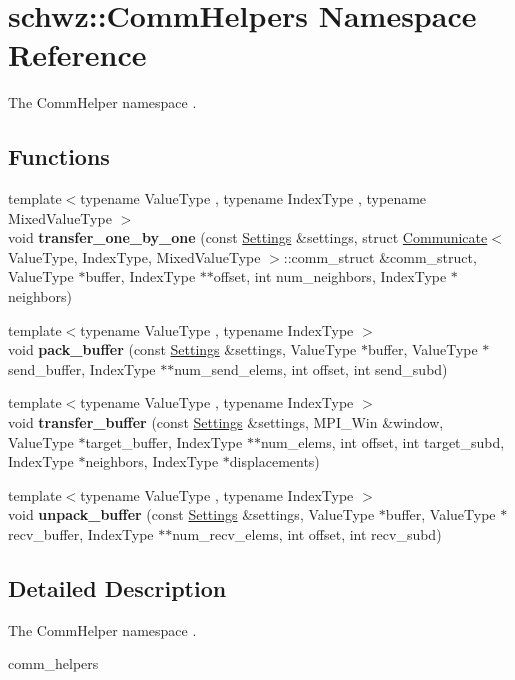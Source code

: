 \hypertarget{namespaceschwz_1_1CommHelpers}{}\section{schwz\+:\+:Comm\+Helpers Namespace Reference}
\label{namespaceschwz_1_1CommHelpers}


The Comm\+Helper namespace .  


\subsection*{Functions}
\begin{DoxyCompactItemize}
\item 
\mbox{\label{namespaceschwz_1_1CommHelpers_ad55122b484f131b8b63e7d82e8ff6e88}} 
{\footnotesize template$<$typename Value\+Type , typename Index\+Type , typename Mixed\+Value\+Type $>$ }\\void {\bfseries transfer\+\_\+one\+\_\+by\+\_\+one} (const \hyperlink{structschwz_1_1Settings}{Settings} \&settings, struct \hyperlink{classschwz_1_1Communicate}{Communicate}$<$ Value\+Type, Index\+Type, Mixed\+Value\+Type $>$\+::comm\+\_\+struct \&comm\+\_\+struct, Value\+Type $\ast$buffer, Index\+Type $\ast$$\ast$offset, int num\+\_\+neighbors, Index\+Type $\ast$neighbors)
\item 
\mbox{\label{namespaceschwz_1_1CommHelpers_af8b226ff485829069e8769eea1a9c1e7}} 
{\footnotesize template$<$typename Value\+Type , typename Index\+Type $>$ }\\void {\bfseries pack\+\_\+buffer} (const \hyperlink{structschwz_1_1Settings}{Settings} \&settings, Value\+Type $\ast$buffer, Value\+Type $\ast$send\+\_\+buffer, Index\+Type $\ast$$\ast$num\+\_\+send\+\_\+elems, int offset, int send\+\_\+subd)
\item 
\mbox{\label{namespaceschwz_1_1CommHelpers_a05d10520ce2980f012ca6e89916801b4}} 
{\footnotesize template$<$typename Value\+Type , typename Index\+Type $>$ }\\void {\bfseries transfer\+\_\+buffer} (const \hyperlink{structschwz_1_1Settings}{Settings} \&settings, M\+P\+I\+\_\+\+Win \&window, Value\+Type $\ast$target\+\_\+buffer, Index\+Type $\ast$$\ast$num\+\_\+elems, int offset, int target\+\_\+subd, Index\+Type $\ast$neighbors, Index\+Type $\ast$displacements)
\item 
\mbox{\label{namespaceschwz_1_1CommHelpers_aaa7aa05475e265f8d22c234a50637626}} 
{\footnotesize template$<$typename Value\+Type , typename Index\+Type $>$ }\\void {\bfseries unpack\+\_\+buffer} (const \hyperlink{structschwz_1_1Settings}{Settings} \&settings, Value\+Type $\ast$buffer, Value\+Type $\ast$recv\+\_\+buffer, Index\+Type $\ast$$\ast$num\+\_\+recv\+\_\+elems, int offset, int recv\+\_\+subd)
\end{DoxyCompactItemize}


\subsection{Detailed Description}
The Comm\+Helper namespace . 

comm\+\_\+helpers 